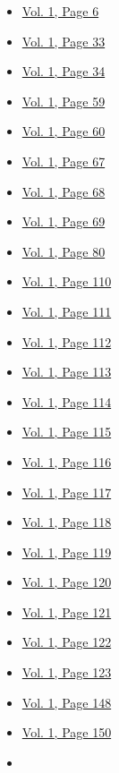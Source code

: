 \begin{itemize}
  \begin{itemize}
  \tightlist
  \item
    \protect\hyperlink{g-page-14}{Vol. 1, Page 6}
  \item
    \protect\hyperlink{g-page-41}{Vol. 1, Page 33}
  \item
    \protect\hyperlink{g-page-42}{Vol. 1, Page 34}
  \item
    \protect\hyperlink{g-page-67}{Vol. 1, Page 59}
  \item
    \protect\hyperlink{g-page-68}{Vol. 1, Page 60}
  \item
    \protect\hyperlink{g-page-75}{Vol. 1, Page 67}
  \item
    \protect\hyperlink{g-page-76}{Vol. 1, Page 68}
  \item
    \protect\hyperlink{g-page-77}{Vol. 1, Page 69}
  \item
    \protect\hyperlink{g-page-88}{Vol. 1, Page 80}
  \item
    \protect\hyperlink{g-page-118}{Vol. 1, Page 110}
  \item
    \protect\hyperlink{g-page-119}{Vol. 1, Page 111}
  \item
    \protect\hyperlink{g-page-120}{Vol. 1, Page 112}
  \item
    \protect\hyperlink{g-page-121}{Vol. 1, Page 113}
  \item
    \protect\hyperlink{g-page-122}{Vol. 1, Page 114}
  \item
    \protect\hyperlink{g-page-123}{Vol. 1, Page 115}
  \item
    \protect\hyperlink{g-page-124}{Vol. 1, Page 116}
  \item
    \protect\hyperlink{g-page-125}{Vol. 1, Page 117}
  \item
    \protect\hyperlink{g-page-126}{Vol. 1, Page 118}
  \item
    \protect\hyperlink{g-page-127}{Vol. 1, Page 119}
  \item
    \protect\hyperlink{g-page-128}{Vol. 1, Page 120}
  \item
    \protect\hyperlink{g-page-129}{Vol. 1, Page 121}
  \item
    \protect\hyperlink{g-page-130}{Vol. 1, Page 122}
  \item
    \protect\hyperlink{g-page-131}{Vol. 1, Page 123}
  \item
    \protect\hyperlink{g-page-156}{Vol. 1, Page 148}
  \item
    \protect\hyperlink{g-page-158}{Vol. 1, Page 150}
  \item

\end{itemize}
\end{itemize}
